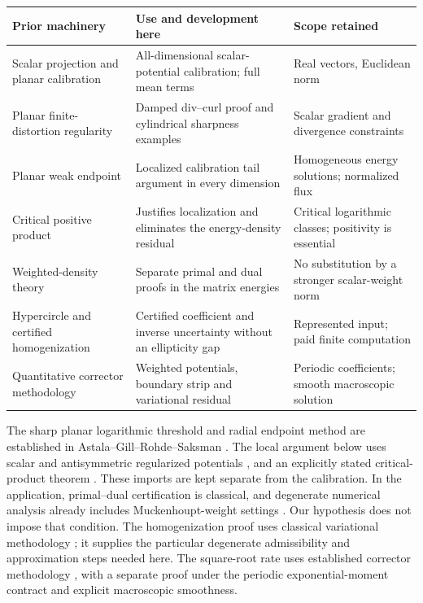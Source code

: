 \documentclass[11pt,a4paper]{article}
\numberwithin{equation}{section}
\theoremstyle{definition}
\theoremstyle{remark}\newtheorem{remark}[theorem]{Remark}
\begin{document}
\begin{center}\small
\begin{tabularx}{\textwidth}{@{}
>{\raggedright\arraybackslash}p{}
>{\raggedright\arraybackslash}X>{\raggedright\arraybackslash}X@{}}
\toprule
Prior machinery&Use and development here&Scope retained\\
\midrule
Scalar projection and planar calibration \cite{Agazzi2026}
&All-dimensional scalar-potential calibration; full mean terms
&Real vectors, Euclidean norm\\
Planar finite-distortion regularity \cite{Astala2010}
&Damped div--curl proof and cylindrical sharpness examples
&Scalar gradient and divergence constraints\\
Planar weak endpoint \cite{NesiPalombaroPonsiglione2014}
&Localized calibration tail argument in every dimension
&Homogeneous energy solutions; normalized flux\\
Critical positive product \cite{Sbordone1997}
&Justifies localization and eliminates the energy-density residual
&Critical logarithmic classes; positivity is essential\\
Weighted-density theory \cite{Ambrosio2015}
&Separate primal and dual proofs in the matrix energies
&No substitution by a stronger scalar-weight norm\\
Hypercircle and certified homogenization
\cite{PragerSynge1947,Vondrejc2015}
&Certified coefficient and inverse uncertainty without an ellipticity gap
&Represented input; paid finite computation\\
Quantitative corrector methodology \cite{Griso2004,BellaKniely2024}
&Weighted potentials, boundary strip and variational residual
&Periodic coefficients; smooth macroscopic solution\\
\bottomrule
\end{tabularx}
\end{center}

The sharp planar logarithmic threshold and radial endpoint method are
established in Astala--Gill--Rohde--Saksman \cite{Astala2010}. The local
argument below uses scalar and antisymmetric regularized potentials
\cite{CostabelMcIntosh2010}, and an explicitly stated critical-product
theorem \cite{Sbordone1997}. These imports are kept separate from the
calibration. In the application, primal--dual certification is classical,
and degenerate numerical analysis already includes Muckenhoupt-weight
settings \cite{AlvarezDuran2023}. Our hypothesis does not impose that
condition. The homogenization proof uses classical variational methodology
\cite{BraidesDefranceschi1998}; it supplies the particular degenerate
admissibility and approximation steps needed here. The square-root rate
uses established corrector methodology
\cite{Griso2004,BellaKniely2024}, with a separate proof under the
periodic exponential-moment contract and explicit macroscopic smoothness.
\end{document}
